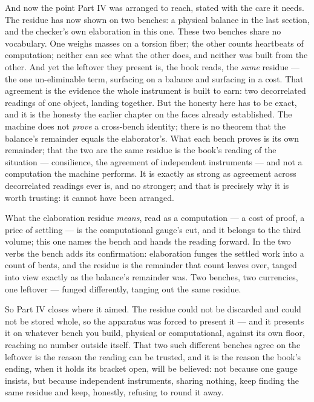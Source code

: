 And now the point Part IV was arranged to reach, stated with the care it needs. The residue has now shown on two
benches: a physical balance in the last section, and the checker's own elaboration in this one. These two benches share
no vocabulary. One weighs masses on a torsion fiber; the other counts heartbeats of computation; neither can see what
the other does, and neither was built from the other. And yet the leftover they present is, the book reads, the
\emph{same} residue --- the one un-eliminable term, surfacing on a balance and surfacing in a cost. That agreement is
the evidence the whole instrument is built to earn: two decorrelated readings of one object, landing together. But the
honesty here has to be exact, and it is the honesty the earlier chapter on the faces already established. The machine
does not \emph{prove} a cross-bench identity; there is no theorem that the balance's remainder equals the elaborator's.
What each bench proves is its own remainder; that the two are the same residue is the book's reading of the situation
--- consilience, the agreement of independent instruments --- and not a computation the machine performs. It is exactly
as strong as agreement across decorrelated readings ever is, and no stronger; and that is precisely why it is worth
trusting: it cannot have been arranged.

What the elaboration residue \emph{means}, read as a computation --- a cost of proof, a price of settling --- is the
computational gauge's cut, and it belongs to the third volume; this one names the bench and hands the reading forward.
In the two verbs the bench adds its confirmation: elaboration funges the settled work into a count of beats, and the
residue is the remainder that count leaves over, tanged into view exactly as the balance's remainder was. Two benches,
two currencies, one leftover --- funged differently, tanging out the same residue.

So Part IV closes where it aimed. The residue could not be discarded and could not be stored whole, so the apparatus
was forced to present it --- and it presents it on whatever bench you build, physical or computational, against its own
floor, reaching no number outside itself. That two such different benches agree on the leftover is the reason the
reading can be trusted, and it is the reason the book's ending, when it holds its bracket open, will be believed: not
because one gauge insists, but because independent instruments, sharing nothing, keep finding the same residue and
keep, honestly, refusing to round it away.
